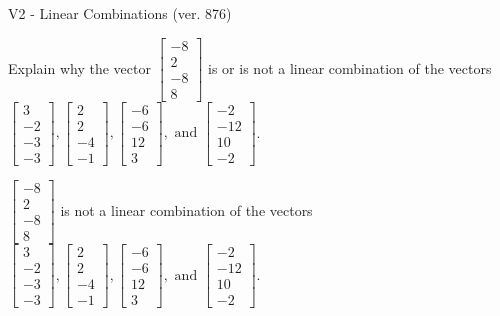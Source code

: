 \begin{exercise}
  \begin{exerciseTitle}V2 - Linear Combinations (ver. 876)\end{exerciseTitle}
  \begin{exerciseStatement}
    Explain why the vector \(\left[\begin{array}{c}
-8 \\
2 \\
-8 \\
8
\end{array}\right]\)  is or is not a linear 
	combination of the vectors \(\left[\begin{array}{c}
3 \\
-2 \\
-3 \\
-3
\end{array}\right] , \left[\begin{array}{c}
2 \\
2 \\
-4 \\
-1
\end{array}\right] , \left[\begin{array}{c}
-6 \\
-6 \\
12 \\
3
\end{array}\right] , \text{ and } \left[\begin{array}{c}
-2 \\
-12 \\
10 \\
-2
\end{array}\right]\).
	


  \end{exerciseStatement}
  \begin{exerciseAnswer}
   \(\left[\begin{array}{c}
-8 \\
2 \\
-8 \\
8
\end{array}\right]\) 
  	 is not  
	a linear combination of the vectors \(\left[\begin{array}{c}
3 \\
-2 \\
-3 \\
-3
\end{array}\right] , \left[\begin{array}{c}
2 \\
2 \\
-4 \\
-1
\end{array}\right] , \left[\begin{array}{c}
-6 \\
-6 \\
12 \\
3
\end{array}\right] , \text{ and } \left[\begin{array}{c}
-2 \\
-12 \\
10 \\
-2
\end{array}\right]\).


\end{exerciseAnswer}
\end{exercise}
